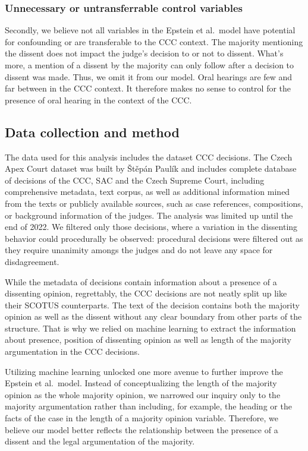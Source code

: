 \documentclass[
  11pt,
]{article}
\begin{document}
\hypertarget{unnecessary-or-untransferrable-control-variables}{%
\subsubsection{Unnecessary or untransferrable control
variables}\label{unnecessary-or-untransferrable-control-variables}}

Secondly, we believe not all variables in the Epstein et al.~model have
potential for confounding or are transferable to the CCC context. The
majority mentioning the dissent does not impact the judge's decision to
or not to dissent. What's more, a mention of a dissent by the majority
can only follow after a decision to dissent was made. Thus, we omit it
from our model. Oral hearings are few and far between in the CCC
context. It therefore makes no sense to control for the presence of oral
hearing in the context of the CCC.

\hypertarget{data-collection-and-method}{%
\subsection{Data collection and
method}\label{data-collection-and-method}}

The data used for this analysis includes the dataset CCC decisions. The
Czech Apex Court dataset was built by Štěpán Paulík and includes
complete database of decisions of the CCC, SAC and the Czech Supreme
Court, including comprehensive metadata, text corpus, as well as
additional information mined from the texts or publicly available
sources, such as case references, compositions, or background
information of the judges. The analysis was limited up until the end of
2022. We filtered only those decisions, where a variation in the
dissenting behavior could procedurally be observed: procedural decisions
were filtered out as they require unanimity amongs the judges and do not
leave any space for disdagreement.

While the metadata of decisions contain information about a presence of
a dissenting opinion, regrettably, the CCC decisions are not neatly
split up like their SCOTUS counterparts. The text of the decision
contains both the majority opinion as well as the dissent without any
clear boundary from other parts of the structure. That is why we relied
on machine learning to extract the information about presence, position
of dissenting opinion as well as length of the majority argumentation in
the CCC decisions.

Utilizing machine learning unlocked one more avenue to further improve
the Epstein et al.~model. Instead of conceptualizing the length of the
majority opinion as the whole majority opinion, we narrowed our inquiry
only to the majority argumentation rather than including, for example,
the heading or the facts of the case in the length of a majority opinion
variable. Therefore, we believe our model better reflects the
relationship between the presence of a dissent and the legal
argumentation of the majority.
\end{document}
